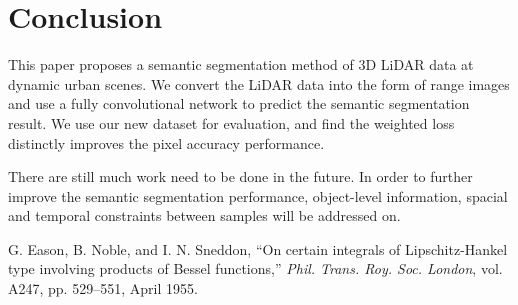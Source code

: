 \section{Conclusion}
This paper proposes a semantic segmentation method of 3D LiDAR data at dynamic urban scenes. We convert the LiDAR data into the form of range images and use a fully convolutional network to predict the semantic segmentation result. We use our new dataset for evaluation, and find the weighted loss distinctly improves the pixel accuracy performance.

There are still much work need to be done in the future. In order to further improve the semantic segmentation performance, object-level information, spacial and temporal constraints between samples will be addressed on.






\begin{thebibliography}{10}

 G. Eason, B. Noble, and I. N. Sneddon, ``On certain integrals of
Lipschitz-Hankel type involving products of Bessel functions,'' {\em Phil.
Trans. Roy. Soc. London}, vol. A247, pp. 529--551, April 1955.


\end{thebibliography}



